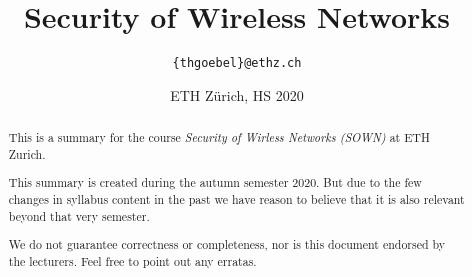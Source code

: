 \documentclass[paper=a4, parskip=half-]{scrartcl}
\title{Security of Wireless Networks}
\author{\texttt{\{thgoebel\}@ethz.ch}}
\date{ETH Zürich, HS 2020}
\begin{document}
\begin{titlepage}
\maketitle
\vspace{5cm}
\thispagestyle{empty}


\begin{abstract}
This is a summary for the course \textit{Security of Wirless Networks (SOWN)} at ETH Zurich.

This summary is created during the autumn semester 2020.
But due to the few changes in syllabus content in the past we have reason to believe that it is also relevant beyond that very semester.

We do not guarantee correctness or completeness, nor is this document endorsed by the lecturers.
Feel free to point out any erratas.
\end{abstract}

\end{titlepage}

\tableofcontents
\newpage



\newpage


\newpage


\newpage


\newpage


\newpage


\newpage


\newpage


\newpage


\end{document}
